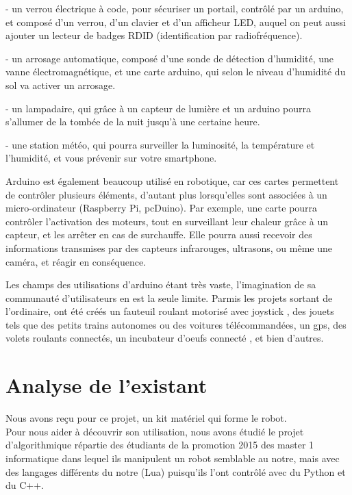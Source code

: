\documentclass[12pt,francais]{report}
\begin{document}
- un verrou électrique à code, pour sécuriser un portail, contrôlé par un arduino, et composé d'un verrou, d'un clavier et d'un afficheur LED, auquel on peut aussi ajouter un lecteur de badges RDID (identification par radiofréquence).

- un arrosage automatique, composé d'une sonde de détection d'humidité, une vanne électromagnétique, et une carte arduino, qui selon le niveau d'humidité du sol va activer un arrosage.

- un lampadaire, qui grâce à un capteur de lumière et un arduino pourra s'allumer de la tombée de la nuit jusqu'à une certaine heure.

- une station météo, qui pourra surveiller la luminosité, la température et l'humidité, et vous prévenir sur votre smartphone.

Arduino est également beaucoup utilisé en robotique, car ces cartes permettent de contrôler plusieurs éléments, d'autant plus lorsqu'elles sont associées à un micro-ordinateur (Raspberry Pi, pcDuino). Par exemple, une carte pourra contrôler l'activation des moteurs, tout en surveillant leur chaleur grâce à un capteur, et les arrêter en cas de surchauffe. Elle pourra aussi recevoir des informations transmises par des capteurs infrarouges, ultrasons, ou même une caméra, et réagir en conséquence. \cite{ref22}

Les champs des utilisations d'arduino étant très vaste, l'imagination de sa communauté d'utilisateurs en est la seule limite. Parmis les projets sortant de l'ordinaire, ont été créés un fauteuil roulant motorisé avec joystick \cite{ref23}, des jouets tels que des petits trains autonomes ou des voitures télécommandées, un gps, des volets roulants connectés, un incubateur d'oeufs connecté \cite{ref24}, et bien d'autres.


\newpage
\section*{Analyse de l'existant}

Nous avons reçu pour ce projet, un kit matériel qui forme le robot.\\
Pour nous aider à découvrir son utilisation, nous avons étudié le projet d'algorithmique répartie des étudiants de la promotion 2015 des master 1 informatique \cite{ref1} dans lequel ils manipulent un robot semblable au notre, mais avec des langages différents du notre (Lua) puisqu'ils l'ont contrôlé avec du Python et du C++.
\end{document}
